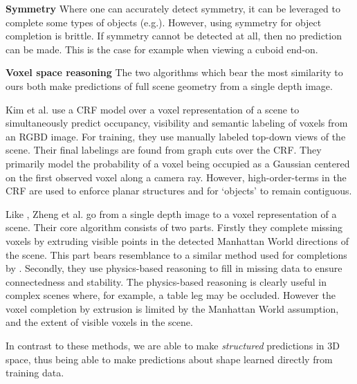\documentclass[10pt,twocolumn,letterpaper]{article}
\makeatletter
\renewcommand*{\eg}{e.g.\@\xspace}
\newcommand*{\ea}{et al.\@\xspace}
\renewcommand{\paragraph}{\vspace{2pt}\noindent\textbf}
\makeatother
\begin{document}
\paragraph{Symmetry}
Where one can accurately detect symmetry, it can be leveraged to complete some types of objects (\eg \cite{law-cviu-2010, thrun-iccv-2005, kroemer-humanoids-2012}).
However, using symmetry for object completion is brittle.
If symmetry cannot be detected at all, then no prediction can be made.
This is the case for example when viewing a cuboid end-on.


\paragraph{Voxel space reasoning}
The two algorithms which bear the most similarity to ours both make predictions of full scene geometry from a single depth image.

Kim \ea \cite{kim-iccv-2013} use a CRF model over a voxel representation of a scene to simultaneously predict occupancy, visibility and semantic labeling of voxels from an RGBD image.
For training, they use manually labeled top-down views of the scene.
Their final labelings are found from graph cuts over the CRF.
They primarily model the probability of a voxel being occupied as a Gaussian centered on the first observed voxel along a camera ray.
However, high-order-terms in the CRF are used to enforce planar structures and for `objects' to remain contiguous.

Like \cite{kim-iccv-2013},  Zheng \ea \cite{zheng-cvpr-2013} go from a single depth image to a voxel representation of a scene.
Their core algorithm consists of two parts.
Firstly they complete missing voxels by extruding visible points in the detected Manhattan World directions of the scene.
This part bears resemblance to a similar method used for completions by \cite{kroemer-humanoids-2012}.
Secondly, they use physics-based reasoning to fill in missing data to ensure connectedness and stability.
The physics-based reasoning is clearly useful in complex scenes where, for example, a table leg may be occluded.
However the voxel completion by extrusion is limited by the Manhattan World assumption, and the extent of visible voxels in the scene.

In contrast to these methods, we are able to make \emph{structured} predictions in 3D space, thus being able to make predictions about shape learned directly from training data.
\end{document}
